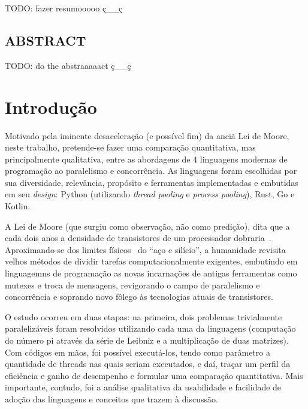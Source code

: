 \documentclass[12pt,a4paper]{article}
\begin{document}
TODO: fazer resumooooo ç__ç

\newpage

\thispagestyle{empty}
\begin{center}
\section*{ABSTRACT}
\end{center}

TODO: do the abstraaaaact ç__ç

\newpage

\thispagestyle{empty}
\renewcommand*\contentsname{SUMÁRIO}
\begin{center}
\tableofcontents
\end{center}
\newpage

\section{Introdução}

Motivado pela iminente desaceleração (e possível fim) da anciã Lei de Moore, neste trabalho, pretende-se fazer uma comparação quantitativa, mas principalmente qualitativa, entre as abordagens de 4 linguagens modernas de programação ao paralelismo e concorrência. As linguagens foram escolhidas por sua diversidade, relevância, propósito e ferramentas implementadas e embutidas em seu \emph{design}: Python (utilizando \emph{thread pooling} e \emph{process pooling}), Rust, Go e Kotlin.

A Lei de Moore (que surgiu como observação, não como predição), dita que a cada dois anos a densidade de transistores de um processador dobraria~\cite{moore1965cramming}. Aproximando-se dos limites físicos~\cite{seabaugh2013tunneling} do ``aço e silício'', a humanidade revisita velhos métodos de dividir tarefas computacionalmente exigentes, embutindo em linguagemns de programação as novas incarnações de antigas ferramentas como mutexes e troca de mensagens, revigorando o campo de paralelismo e concorrência e soprando novo fôlego às tecnologias atuais de transistores.

O estudo ocorreu em duas etapas: na primeira, dois problemas trivialmente paralelizáveis foram resolvidos utilizando cada uma da linguagens (computação do número pi através da série de Leibniz e a multiplicação de duas matrizes). Com códigos em mãos, foi possível executá-los, tendo como parâmetro a quantidade de threads nas quais seriam executados, e daí, traçar um perfil da eficiência e ganho de desempenho e formular uma comparação quantitativa. Mais importante, contudo, foi a análise qualitativa da usabilidade e facilidade de adoção das linguagens e conceitos que trazem à discussão.
\end{document}
